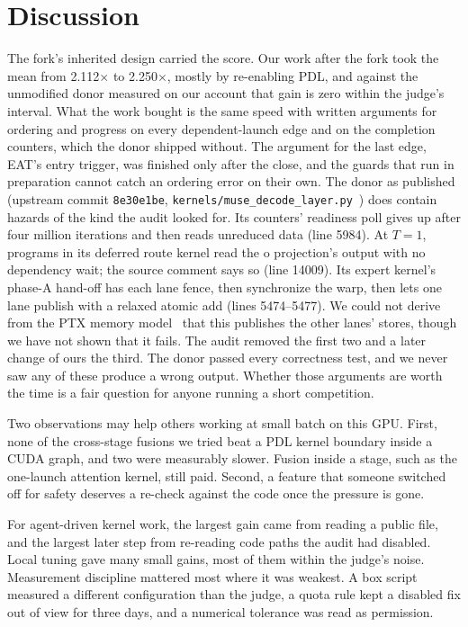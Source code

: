 \documentclass[11pt]{article}
\begin{document}
\section{Discussion}

The fork's inherited design carried the score. Our work after the fork took the
mean from 2.112$\times$ to 2.250$\times$, mostly by re-enabling PDL, and against the unmodified donor
measured on our account that gain is zero within the judge's interval. What the
work bought is the same speed with written arguments for ordering and progress on
every dependent-launch edge and on the completion counters, which the donor
shipped without. The argument for the last edge, EAT's entry trigger, was finished
only after the close, and the guards that run in preparation cannot catch an
ordering error on their own. The donor as published (upstream commit \texttt{8e30e1be},
\texttt{kernels/muse\_decode\_layer.py}~\cite{keell}) does contain hazards of
the kind the audit looked for. Its counters' readiness poll gives up after four
million iterations and then reads unreduced data (line 5984). At $T=1$, programs in
its deferred route kernel read the o projection's output with no dependency wait;
the source comment says so (line 14009). Its expert kernel's phase-A hand-off has
each lane fence, then synchronize the warp, then lets one lane publish with a
relaxed atomic add (lines 5474--5477). We could not derive from the PTX memory
model~\cite{ptx} that this publishes the other lanes' stores, though we have not
shown that it fails. The audit removed the first two and a later change of ours the
third. The donor passed every
correctness test, and we never saw any of these produce a wrong output.
Whether those arguments are worth the time is a fair question for anyone running a
short competition.

Two observations may help others working at small batch on this GPU. First, none
of the cross-stage fusions we tried beat a PDL kernel boundary inside a CUDA
graph, and two were measurably slower. Fusion inside a stage, such
as the one-launch attention kernel, still paid. Second, a feature that someone
switched off for safety deserves a re-check against the code once the pressure is
gone.

For agent-driven kernel work, the largest gain came from reading a public file,
and the largest later step from re-reading code paths the audit had disabled.
Local tuning gave many small gains, most of them within the judge's noise.
Measurement discipline mattered most where it was weakest. A box script measured a
different configuration than the judge, a quota rule kept a disabled fix out of
view for three days, and a numerical tolerance was read as permission.
\end{document}
